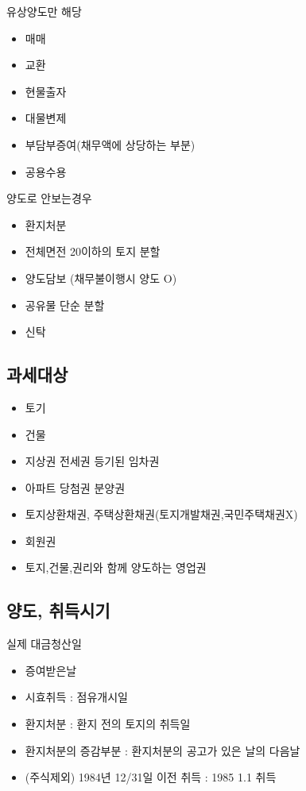 \documentclass{oblivoir}
\begin{document}
\begin{multicols}{2}
유상양도만 해당

\begin{itemize}
\itemsep1pt\parskip0pt
\item
  매매
\item
  교환
\item
  현물출자
\item
  대물변제
\item
  부담부증여(채무액에 상당하는 부분)
\item
  공용수용
\end{itemize}

양도로 안보는경우

\begin{itemize}
\itemsep1pt\parskip0pt
\item
  환지처분
\item
  전체면전 20이하의 토지 분할
\item
  양도담보 (채무불이행시 양도 O)
\item
  공유물 단순 분할
\item
  신탁
\end{itemize}

\subsection{과세대상}\label{uxacfcuxc138uxb300uxc0c1-1}

\begin{itemize}
\itemsep1pt\parskip0pt
\item
  토기
\item
  건물
\item
  지상권 전세권 등기된 임차권
\item
  아파트 당첨권 분양권
\item
  토지상환채권, 주택상환채권(토지개발채권,국민주택채권X)
\item
  회원권
\item
  토지,건물,권리와 함께 양도하는 영업권
\end{itemize}

\subsection{양도, 취득시기}\label{uxc591uxb3c4-uxcde8uxb4dduxc2dcuxae30}

실제 대금청산일

\begin{itemize}
\itemsep1pt\parskip0pt
\item
  증여받은날
\item
  시효취득 : 점유개시일
\item
  환지처분 : 환지 전의 토지의 취득일
\item
  환지처분의 증감부분 : 환지처분의 공고가 있은 날의 다음날
\item
  (주식제외) 1984년 12/31일 이전 취득 : 1985 1.1 취득
\end{itemize}


\end{multicols}
\end{document}
